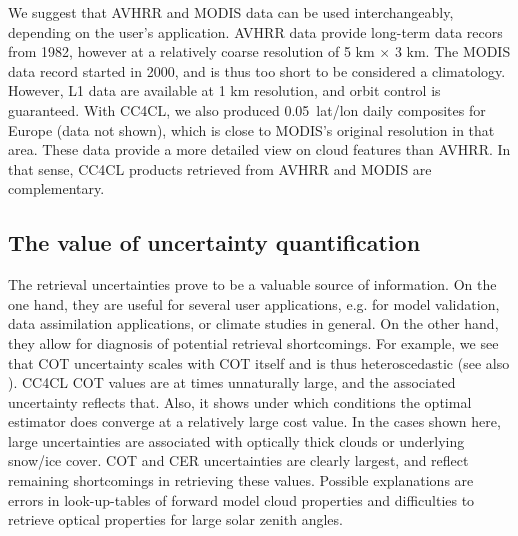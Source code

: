 We suggest that AVHRR and MODIS data can be used interchangeably, depending on the user's application. AVHRR data provide long-term data recors from 1982, however at a relatively coarse resolution of 5 km $\times$ 3 km. The MODIS data record started in 2000, and is thus too short to be considered a climatology. However, L1 data are available at 1 km resolution, and orbit control is guaranteed. With CC4CL, we also produced 0.05\textdegree\ lat/lon daily composites for Europe (data not shown), which is close to MODIS's original resolution in that area. These data provide a more detailed view on cloud features than AVHRR. In that sense, CC4CL products retrieved from AVHRR and MODIS are complementary.

\subsection{The value of uncertainty quantification}


The retrieval uncertainties prove to be a valuable source of information. On the one hand, they are useful for several user applications, e.g. for model validation, data assimilation applications, or climate studies in general. On the other hand, they allow for diagnosis of potential retrieval shortcomings. For example, we see that COT uncertainty scales with COT itself and is thus heteroscedastic (see also \citet{Poulsen12}). CC4CL COT values are at times unnaturally large, and the associated uncertainty reflects that. Also, it shows under which conditions the optimal estimator does converge at a relatively large cost value. In the cases shown here, large uncertainties are associated with optically thick clouds or underlying snow/ice cover. COT and CER uncertainties are clearly largest, and reflect remaining shortcomings in retrieving these values. Possible explanations are errors in look-up-tables of forward model cloud properties and difficulties to retrieve optical properties for large solar zenith angles.

